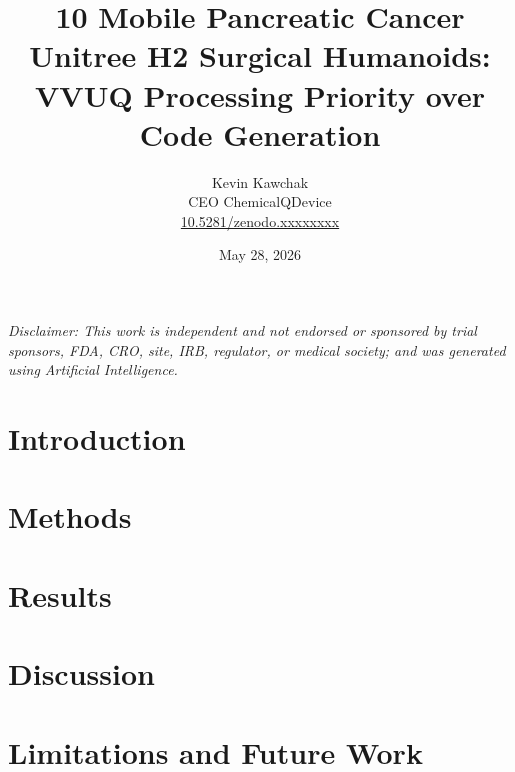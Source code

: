 \documentclass[11pt]{article}
\title{10 Mobile Pancreatic Cancer Unitree H2 Surgical Humanoids: VVUQ Processing Priority over Code Generation}
\author{
  Kevin Kawchak\hspace{2pt}\orcidicon{0009-0007-5457-8667} \\
  CEO ChemicalQDevice\\
  \href{https://doi.org/10.5281/zenodo.xxxxxxxx}{10.5281/zenodo.xxxxxxxx} \\
}
\date{May 28, 2026}
\begin{document}
\maketitle

\begin{abstract}

\end{abstract}

\vspace{0.2em}
\noindent\footnotesize\textit{Disclaimer: This work is independent and not
endorsed or sponsored by trial sponsors, FDA, CRO, site, IRB, regulator, or
medical society; and was generated using Artificial Intelligence.}
\normalsize


\vspace{-0.2cm}

\section{Introduction}
\label{sec:introduction}


\tableofcontents
\vspace{0.4cm}

\newpage
\section{Methods}
\label{sec:methods}

\newpage

\section{Results}
\label{sec:results}

\newpage

\section{Discussion}
\label{sec:discussion}


\section{Limitations and Future Work}
\label{sec:limitations}

\newpage
\end{document}
